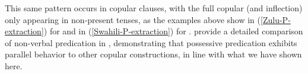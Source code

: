 \documentclass[output=paper,
modfonts
]{langscibook}
\begin{document}
\begin{exe}
\ex \begin{xlist}




\end{xlist}
\end{exe}


This same pattern occurs in copular clauses, with the full copular
 (and inflection) only appearing  in non-present tenses, as the
examples above show in (\ref{Zulu-P-extraction}) for  and in
(\ref{Swahili-P-extraction}) for . \citet{Buell:2013} provide a
detailed comparison of non-verbal predication in , demonstrating
that possessive predication exhibits parallel behavior to other copular constructions, in line with what we have shown here. 


%
%
\end{document}
